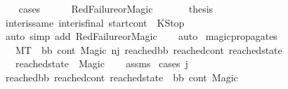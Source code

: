 \begin{isabellebody}
\ \ \isamarkupfalse%
\ cases\isanewline
\ \ \ \ \isamarkupfalse%
\ RedFailure{\isacharunderscore}{\kern0pt}or{\isacharunderscore}{\kern0pt}Magic\ \isanewline
\ \ \ \ \isamarkupfalse%
\ {\isacharquery}{\kern0pt}thesis\isanewline
\ \ \ \ \ \ \isamarkupfalse%
\ inter{\isacharunderscore}{\kern0pt}is{\isacharunderscore}{\kern0pt}same\ inter{\isacharunderscore}{\kern0pt}is{\isacharunderscore}{\kern0pt}final\ {\isacartoucheopen}start{\isacharunderscore}{\kern0pt}cont\ {\isacharequal}{\kern0pt}\ KStop{\isacartoucheclose}\ \isanewline
\ \ \ \ \ \ \isamarkupfalse%
\ {\isacharparenleft}{\kern0pt}auto\ simp\ add{\isacharcolon}{\kern0pt}\ RedFailure{\isacharunderscore}{\kern0pt}or{\isacharunderscore}{\kern0pt}Magic{\isacharparenright}{\kern0pt}\isanewline
\ \ \isamarkupfalse%
\ auto\isanewline
{}\isamarkupfalse%
%
\endisatagproof
{\isafoldproof}%
%
\isadelimproof
\isanewline
%
\endisadelimproof
\isanewline
{}\isamarkupfalse%
\ magic{\isacharunderscore}{\kern0pt}propagates{\isacharcolon}{\kern0pt}\ \isanewline
\ \ \ {\isachardoublequoteopen}M{\isacharcomma}{\kern0pt}{\isasymLambda}{\isacharcomma}{\kern0pt}{\isasymGamma}{\isacharcomma}{\kern0pt}{\isasymOmega}{\isacharcomma}{\kern0pt}T\ {\isasymturnstile}\ {\isacharparenleft}{\kern0pt}bb{\isacharcomma}{\kern0pt}\ cont{\isacharcomma}{\kern0pt}\ Magic{\isacharparenright}{\kern0pt}\ {\isacharminus}{\kern0pt}n{\isasymlongrightarrow}{\isacharcircum}{\kern0pt}j\ {\isacharparenleft}{\kern0pt}reached{\isacharunderscore}{\kern0pt}bb{\isacharcomma}{\kern0pt}\ reached{\isacharunderscore}{\kern0pt}cont{\isacharcomma}{\kern0pt}\ reached{\isacharunderscore}{\kern0pt}state{\isacharparenright}{\kern0pt}{\isachardoublequoteclose}\isanewline
\ \ \ {\isachardoublequoteopen}reached{\isacharunderscore}{\kern0pt}state\ {\isacharequal}{\kern0pt}\ Magic{\isachardoublequoteclose}\isanewline
%
\isadelimproof
\ \ %
\endisadelimproof
%
\isatagproof
{}\isamarkupfalse%
\ assms\isanewline
{}\isamarkupfalse%
\ {\isacharparenleft}{\kern0pt}cases\ j{\isacharparenright}{\kern0pt}\isanewline
\ \ \isamarkupfalse%
\ {}\ \isanewline
\ \ \isamarkupfalse%
\ {\isachardoublequoteopen}{\isacharparenleft}{\kern0pt}reached{\isacharunderscore}{\kern0pt}bb{\isacharcomma}{\kern0pt}\ reached{\isacharunderscore}{\kern0pt}cont{\isacharcomma}{\kern0pt}\ reached{\isacharunderscore}{\kern0pt}state{\isacharparenright}{\kern0pt}\ {\isacharequal}{\kern0pt}\ {\isacharparenleft}{\kern0pt}bb{\isacharcomma}{\kern0pt}\ cont{\isacharcomma}{\kern0pt}\ Magic{\isacharparenright}{\kern0pt}{\isachardoublequoteclose}\ \isamarkupfalse%

\end{isabellebody}
